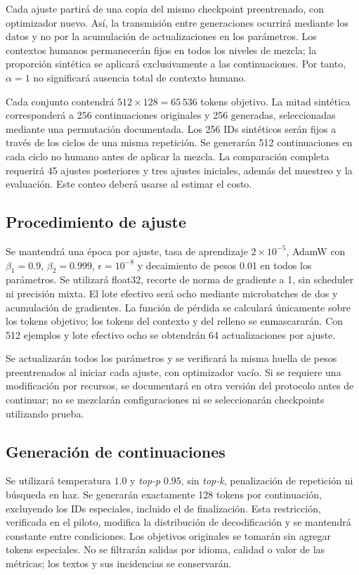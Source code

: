 \documentclass[12pt,letterpaper]{article}
\begin{document}
Cada ajuste partirá de una copia del mismo checkpoint preentrenado, con
optimizador nuevo. Así, la transmisión entre generaciones ocurrirá mediante
los datos y no por la acumulación de actualizaciones en los parámetros.
Los contextos humanos permanecerán fijos en todos los niveles de mezcla;
la proporción sintética se aplicará exclusivamente a las continuaciones.
Por tanto, \(\alpha=1\) no significará ausencia total de contexto humano.

Cada conjunto contendrá \(512\times128=65\,536\) tokens objetivo. La mitad
sintética corresponderá a 256 continuaciones originales y 256 generadas,
seleccionadas mediante una permutación documentada. Los 256 IDs sintéticos
serán fijos a través de los ciclos de una misma repetición. Se generarán
512 continuaciones en cada ciclo no humano antes de aplicar la mezcla.
La comparación completa
requerirá 45 ajustes posteriores y tres ajustes iniciales, además del
muestreo y la evaluación. Este conteo deberá usarse al estimar el costo.

\subsection{Procedimiento de ajuste}

Se mantendrá una época por ajuste, tasa de aprendizaje \(2\times10^{-5}\),
AdamW con \(\beta_1=0.9\), \(\beta_2=0.999\), \(\epsilon=10^{-8}\)
y decaimiento de pesos 0.01 en todos los parámetros. Se utilizará float32,
recorte de norma de gradiente a 1, sin scheduler ni precisión mixta. El lote
efectivo será ocho mediante microbatches de dos y acumulación de gradientes.
La función de pérdida se calculará únicamente sobre los tokens objetivo;
los tokens del contexto y del relleno se enmascararán. Con 512 ejemplos y
lote efectivo ocho se obtendrán 64 actualizaciones por ajuste.

Se actualizarán todos los parámetros y se verificará la misma huella de
pesos preentrenados al iniciar cada ajuste, con optimizador vacío. Si se
requiere una modificación por recursos, se documentará en otra versión
del protocolo antes de continuar; no se mezclarán configuraciones ni se
seleccionarán checkpoints utilizando prueba.

\subsection{Generación de continuaciones}

Se utilizará temperatura \(1.0\) y \textit{top-p} \(0.95\), sin
\textit{top-k}, penalización de repetición ni búsqueda en haz. Se generarán
exactamente 128 tokens por continuación, excluyendo los IDs especiales,
incluido el de finalización. Esta restricción, verificada en el piloto,
modifica la distribución de decodificación y se mantendrá constante entre
condiciones. Los objetivos originales se tomarán sin agregar tokens
especiales. No se filtrarán salidas por idioma, calidad o valor de las
métricas; los textos y sus incidencias se conservarán.
\end{document}
